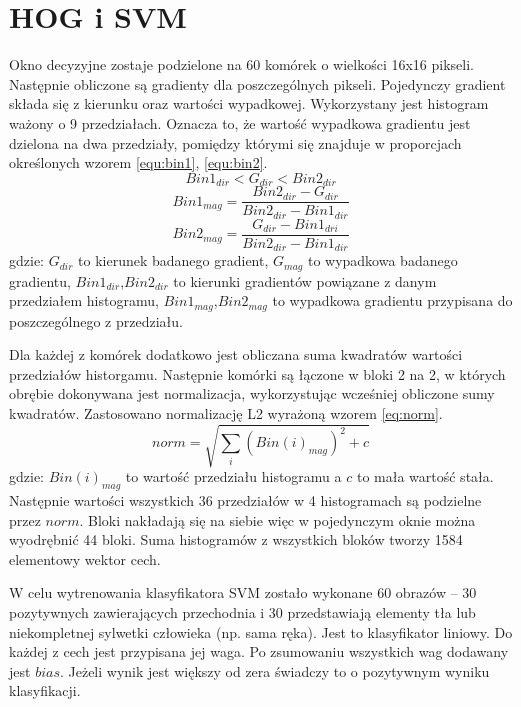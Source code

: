 \section{HOG i SVM}
Okno decyzyjne zostaje podzielone na 60 komórek o wielkości 16x16 pikseli.
Następnie obliczone są gradienty dla poszczególnych pikseli. Pojedynczy gradient składa się z kierunku oraz wartości wypadkowej. Wykorzystany jest histogram ważony o 9 przedziałach. Oznacza to, że wartość wypadkowa gradientu jest dzielona na dwa przedziały, pomiędzy którymi się znajduje w proporcjach określonych wzorem \eqref{equ:bin1}, \eqref{equ:bin2}.
\begin{equation}\label{equ:bin0}
Bin1_{dir} < G_{dir} < Bin2_{dir}
\end{equation}
\begin{equation}\label{equ:bin1}
Bin1_{mag} = \frac{Bin2_{dir} - G_{dir}}{Bin2_{dir} - Bin1_{dir}}
\end{equation}
\begin{equation}\label{equ:bin2}
Bin2_{mag} = \frac{G_{dir}- Bin1_{dri}}{Bin2_{dir} - Bin1_{dir}}
\end{equation}
\noindent gdzie: $G_{dir}$ to kierunek badanego gradient, $G_{mag}$ to wypadkowa badanego gradientu, $Bin1_{dir}$,$Bin2_{dir}$ to kierunki gradientów powiązane z danym przedziałem histogramu, $Bin1_{mag}$,$Bin2_{mag}$ to wypadkowa gradientu przypisana do poszczególnego z przedziału.

Dla każdej z komórek dodatkowo jest obliczana suma kwadratów wartości przedziałów historgamu.
Następnie komórki są łączone w bloki 2 na 2, w których obrębie dokonywana jest normalizacja, wykorzystując wcześniej obliczone sumy kwadratów. Zastosowano normalizację L2 wyrażoną wzorem \eqref{eq:norm}.
\begin{equation}\label{eq:norm}
norm = \sqrt{\sum_{i} (Bin(i)_{mag})^2 + c}
\end{equation}
\noindent gdzie: $Bin(i)_{mag}$ to wartość przedziału histogramu a $c$ to mała wartość stała.
Następnie wartości wszystkich 36 przedziałów w 4 histogramach są podzielne przez $norm$.
Bloki nakładają się na siebie więc w pojedynczym oknie można wyodrębnić 44 bloki. %
Suma histogramów z wszystkich bloków tworzy 1584 elementowy wektor cech.

W celu wytrenowania klasyfikatora SVM zostało wykonane 60 obrazów – 30 pozytywnych zawierających przechodnia i 30 przedstawiają elementy tła lub niekompletnej sylwetki człowieka (np. sama ręka).
Jest to klasyfikator liniowy. Do każdej z cech jest przypisana jej waga. Po zsumowaniu wszystkich wag dodawany jest $bias$. Jeżeli wynik jest większy od zera świadczy to o pozytywnym wyniku klasyfikacji.

